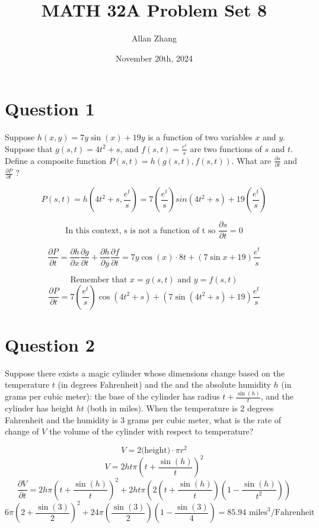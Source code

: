 \documentclass[hidelinks]{article}
\title{\textbf{MATH 32A Problem Set 8}}
\author{Allan Zhang}
\date{November 20th, 2024}
\begin{document}
\hypersetup{bookmarksnumbered=true,}
\pagecolor{white}
\color{black}
\maketitle


\section{Question 1}
Suppose $h(x, y) = 7y \sin(x) + 19y$ is a function of two variables $x$ and $y$.
Suppose that $g(s, t) = 4t^2 + s$, and $f(s, t) = \frac{e^t}{s}$ are two functions of $s$ and $t$. Define a
composite function $P(s, t) = h(g(s, t), f(s, t))$. What are $\frac{\partial s}{\partial t}$ and $\frac{\partial P}{\partial t}$ ? 

\[
	P(s, t) = h(4t^2+s, \frac{e^t}{s}) = 7(\frac{e^t}{s})sin(4t^2+s) + 19(\frac{e^t}{s})
\]

\[
	\text{In this context, s is not a function of t so } \frac{\partial s}{\partial t} = 0 
\]

\[
	\frac{\partial P}{\partial t} = \frac{\partial h}{\partial x}\frac{\partial g}{\partial t} + \frac{\partial h}{\partial y} \frac{\partial f}{\partial t} = 7y\cos(x) \cdot 8t + (7\sin{x} + 19) \frac{e^t}{s}
\]

\[
	\text{Remember that } x = g(s, t) \text{ and } y = f(s, t)
\]
\[
	\frac{\partial P}{\partial t} = 7(\frac{e^t}{s})\cos(4t^2 + s) + (7\sin(4t^2+s) + 19)\frac{e^t}{s} 
\]
\newpage

\section{Question 2}
Suppose there exists a magic cylinder whose dimensions change based on the
temperature $t$ (in degrees Fahrenheit) and the and the absolute humidity $h$ (in grams per
cubic meter): the base of the cylinder has radius $t + \frac{\sin(h)}{t}$, and the cylinder has height
$ht$ (both in miles). When the temperature is 2 degrees Fahrenheit and the humidity is 3
grams per cubic meter, what is the rate of change of $V$ the volume of the cylinder with
respect to temperature?

\[
	V = 2\text{(height)}\cdot\pi r^2 
\]
\[
	V = 2ht\pi(t + \frac{\sin(h)}{t})^2
\]
\[
	\frac{\partial V}{\partial t} = 2h\pi (t + \frac{\sin(h)}{t})^2 + 2ht\pi (2(t + \frac{\sin(h)}{t})(1 -\frac{\sin(h)}{t^2}))
\]
\[
	6\pi(2 + \frac{\sin(3)}{2})^2 + 24\pi(\frac{\sin(3)}{2})(1 - \frac{\sin(3)}{4}) = 85.94\text{ miles}^3/\text{Fahrenheit}
\]
\newpage
\end{document}
